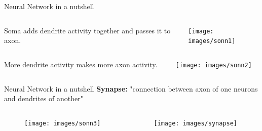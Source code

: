 \documentclass[10pt]{beamer}
\begin{document}
	\begin{frame}[t]{Neural Network in a nutshell}
		\begin{columns}
				\begin{column}{0.5\textwidth}
					\begin{center}
						\large{Soma adds dendrite activity together and passes it to axon.}
					\end{center}
				\end{column}
				\begin{column}{0.5\textwidth}
					\begin{center}
						\texttt{[image: images/sonn1]}
					\end{center}
				\end{column}
		\end{columns}
		\begin{columns}
				\begin{column}{0.5\textwidth}
					\begin{center}
						\large{More dendrite activity makes more axon activity.}
					\end{center}
				\end{column}
				\begin{column}{0.5\textwidth}
					\begin{center}
						\texttt{[image: images/sonn2]}
					\end{center}
				\end{column}
		\end{columns}
	\end{frame}
	\begin{frame}[c]{Neural Network in a nutshell}
		\large{\textbf{Synapse:} "connection between axon of one neurons and dendrites of another"}
		\begin{columns}
			\begin{column}{0.5\textwidth}
				\begin{center}
					\begin{figure}
						\texttt{[image: images/sonn3]}
					\end{figure}
				\end{center}
			\end{column}
			\begin{column}{0.5\textwidth}
				\begin{center}
					\begin{figure}
						\texttt{[image: images/synapse]}
					\end{figure}
				\end{center}
			\end{column}
		\end{columns}
	\end{frame}
\end{document}
